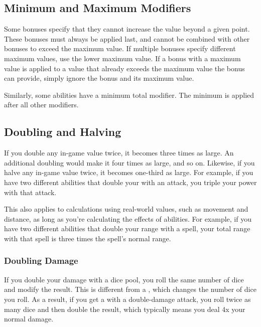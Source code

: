     \subsection{Minimum and Maximum Modifiers}\label{Minimum and Maximum Modifiers}
        Some bonuses specify that they cannot increase the value beyond a given point.
        These bonuses must always be applied last, and cannot be combined with other bonuses to exceed the maximum value.
        If multiple bonuses specify different maximum values, use the lower maximum value.
        If a bonus with a maximum value is applied to a value that already exceeds the maximum value the bonus can provide, simply ignore the bonus and its maximum value.

        Similarly, some abilities have a minimum total modifier.
        The minimum is applied after all other modifiers.

    \subsection{Doubling and Halving}\label{Doubling and Halving}
        If you double any in-game value twice, it becomes three times as large.
        An additional doubling would make it four times as large, and so on.
        Likewise, if you halve any in-game value twice, it becomes one-third as large.
        For example, if you have two different abilities that double your  with an attack, you triple your power with that attack.

        This also applies to calculations using real-world values, such as movement and distance, as long as you're calculating the effects of abilities.
        For example, if you have two different abilities that double your range with a spell, your total range with that spell is three times the spell's normal range.

        \subsubsection{Doubling Damage}
            If you double your damage with a dice pool, you roll the same number of dice and modify the result.
            This is different from a , which changes the number of dice you roll.
            As a result, if you get a  with a double-damage attack, you roll twice as many dice and then double the result, which typically means you deal 4x your normal damage.

